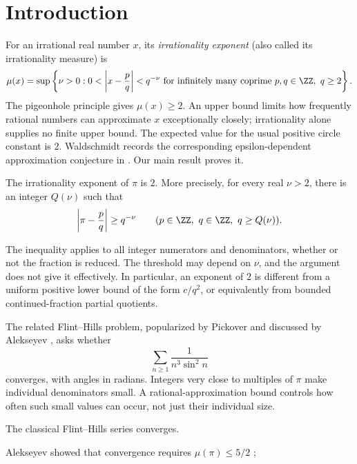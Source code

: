 \maketitle

\begin{abstract}
We prove the conjecture that the irrationality exponent of \(\pi\) is \(2\).
As a consequence, the classical Flint--Hills series
\(\sum_{n\ge1}1/(n^3\sin^2 n)\) converges, with angles in radians.
\end{abstract}

\section{Introduction}\label{sec:introduction}

For an irrational real number \(x\), its \emph{irrationality exponent}
(also called its irrationality measure) is
\[
\mu(x)=\sup\left\{\nu>0:
0<\left|x-\frac pq\right|<q^{-\nu}
\text{ for infinitely many coprime }p,q\in\ZZ,\ q\ge2\right\}.
\]
The pigeonhole principle gives \(\mu(x)\ge2\). An upper bound limits
how frequently rational numbers can approximate \(x\) exceptionally
closely; irrationality alone supplies no finite upper bound. The expected
value for the usual positive circle constant is \(2\). Waldschmidt
records the corresponding epsilon-dependent approximation conjecture
in \cite[p.~265]{waldschmidt}. Our main result proves it.

\begin{theorem}\label{thm:main}
The irrationality exponent of \(\pi\) is \(2\). More precisely, for every
real \(\nu>2\), there is an integer \(Q(\nu)\) such that
\[
\left|\pi-\frac pq\right|\ge q^{-\nu}
\qquad(p\in\ZZ,\ q\in\ZZ,\ q\ge Q(\nu)).
\]
\end{theorem}

The inequality applies to all integer numerators and denominators,
whether or not the fraction is reduced. The threshold may depend on
\(\nu\), and the argument does not give it effectively. In particular,
an exponent of \(2\) is different from a uniform positive lower bound
of the form \(c/q^2\), or equivalently from bounded continued-fraction
partial quotients.

The related Flint--Hills problem, popularized by Pickover and discussed
by Alekseyev \cite{alekseyev}, asks whether
\[
\sum_{n\ge1}\frac{1}{n^3\sin^2 n}
\]
converges, with angles in radians. Integers very close to multiples of
\(\pi\) make individual denominators small. A rational-approximation
bound controls how often such small values can occur, not just their
individual size.

\begin{corollary}\label{thm:flinthills}
The classical Flint--Hills series converges.
\end{corollary}

Alekseyev showed that convergence requires
\(\mu(\pi)\le5/2\) \cite[Corollary~4]{alekseyev};
